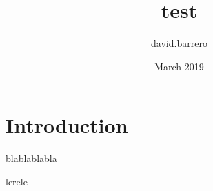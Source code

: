 \documentclass{article}
\title{test}
\author{david.barrero }
\date{March 2019}
\begin{document}
\maketitle

\section{Introduction}
blablablabla

lerele
\end{document}
